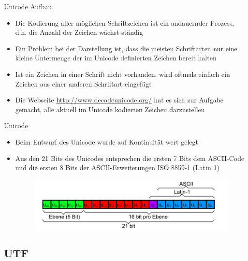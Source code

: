 \documentclass[12pt%
,xcolor=table
,aspectratio=169%
]{beamer}
\begin{document}
\begin{frame}{Unicode Aufbau}
\begin{itemize}
	\item Die Kodierung aller möglichen Schriftzeichen ist ein andauernder Prozess, d.h. die Anzahl der Zeichen wächst ständig
	\item Ein Problem bei der Darstellung ist, dass die meisten Schriftarten nur eine kleine Untermenge der im Unicode definierten Zeichen bereit halten
    \item Ist ein Zeichen in einer Schrift nicht vorhanden, wird oftmals einfach ein Zeichen aus einer anderen Schriftart eingefügt
    \item Die Webseite \url{http://www.decodeunicode.org/} hat es sich zur Aufgabe gemacht, alle aktuell im Unicode kodierten Zeichen darzustellen
\end{itemize}

\end{frame}

\begin{frame}{Unicode}
\begin{itemize}
	\item Beim Entwurf des Unicode wurde auf Kontinuität wert gelegt
	\item Aus den 21 Bits des Unicodes entsprechen die ersten 7 Bits dem ASCII-Code und die ersten 8 Bits der ASCII-Erweiterungen ISO 8859-1 (Latin 1)
	\begin{figure}
	\center
	\includegraphics[scale=0.4]{pictures/unicode1}
	\end{figure}
\end{itemize}

\end{frame}

\subsection{UTF}
\end{document}
